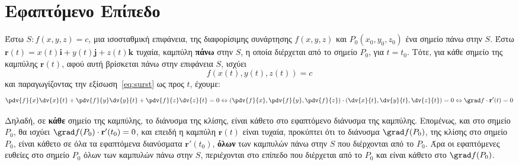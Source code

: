 \section*{Εφαπτόμενο Επίπεδο}

Έστω $S: f(x,y,z)=c $, μια \textcolor{Col1}{ισοσταθμική επιφάνεια}, της διαφορίσιμης 
συνάρτησης $ f(x,y,z) $ και $ P_{0}(x_{0}, y_{0}, z_{0}) $ ένα σημείο πάνω στην $S$.  
Έστω $ \mathbf{r}(t) = x(t)\mathbf{i}+y(t)\mathbf{j}+z(t)\mathbf{k} $ τυχαία, 
καμπύλη \textbf{πάνω} στην $S$, η οποία διέρχεται από το σημείο $ P_{0} $, για 
$ t=t_{0} $.  
Τότε, για κάθε σημείο της καμπύλης $ \mathbf{r}(t) $, αφού αυτή βρίσκεται πάνω στην 
επιφάνεια $S$, ισχύει  
\begin{equation} \label{eq:surst}
  f(x(t),y(t),z(t)) = c 
\end{equation}
και παραγωγίζοντας την εξίσωση~\eqref{eq:surst} ως προς $t$, έχουμε:
\[
  \pdv{f}{x} \dv{x}{t} + \pdv{f}{y} \dv{y}{t} + \pdv{f}{z} \dv{z}{t} = 0 \Leftrightarrow 
  \left(\pdv{f}{x} , \pdv{f}{y} , \pdv{f}{z}\right) \cdot 
  \left(\dv{x}{t} , \dv{y}{t} , \dv{z}{t}\right) =0 \Leftrightarrow 
  \grad f \cdot \mathbf{r'}(t) = 0
\] 

Δηλαδή, σε \textbf{κάθε} σημείο της καμπύλης, το διάνυσμα της κλίσης, είναι κάθετο στο 
εφαπτόμενο διάνυσμα της καμπύλης. Επομένως, και στο σημείο $ P_{0} $, θα ισχύει 
$ \grad f(P_{0}) \cdot \mathbf{r'}(t_{0}) = 0 $, και επειδή η καμπύλη $ \mathbf{r}(t) $
είναι τυχαία, προκύπτει ότι το διάνυσμα $ \grad f(P_{0}) $, της κλίσης στο σημείο 
$ P_{0} $, είναι κάθετο σε όλα τα εφαπτόμενα διανύσματα 
$ \mathbf{r'}(t_{0}) $, \textbf{όλων} των καμπυλών πάνω στην $S$ που διέρχονται από το 
$ P_{0} $. Άρα οι εφαπτόμενες ευθείες στο σημείο $ P_{0} $ όλων των καμπυλών πάνω στην 
$S$, περιέχονται στο επίπεδο που διέρχεται από το $ P_{0} $ και είναι κάθετο στο 
$ \grad f(P_{0}) $. 

